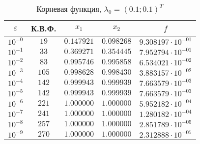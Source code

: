 \documentclass[a4paper,12pt,notitlepage,pdftex,headsepline]{scrartcl}
\begin{document}
        \begin{table}[ht]
          \centering
          \caption{Корневая функция, $\lambda_0 = (0.1; 0.1)^T$}
          \begin{tabular}{|c|c|c|c|c|}
            \hline
            $\varepsilon$ & К.В.Ф. & $x_1$ & $x_2$ & $f$\\
            \hline
            $10^{-0}$ & $19$ & $0.147921$ & $0.098268$ & $9.308197\cdot 10^{-01}$\\
            $10^{-1}$ & $33$ & $0.369271$ & $0.354445$ & $7.952794\cdot 10^{-01}$\\
            $10^{-2}$ & $83$ & $0.995746$ & $0.995858$ & $6.534021\cdot 10^{-02}$\\
            $10^{-3}$ & $105$ & $0.998628$ & $0.998430$ & $3.883157\cdot 10^{-02}$\\
            $10^{-4}$ & $142$ & $0.999943$ & $0.999939$ & $7.663579\cdot 10^{-03}$\\
            $10^{-5}$ & $142$ & $0.999943$ & $0.999939$ & $7.663579\cdot 10^{-03}$\\
            $10^{-6}$ & $221$ & $1.000000$ & $1.000000$ & $5.952182\cdot 10^{-04}$\\
            $10^{-7}$ & $241$ & $1.000000$ & $1.000000$ & $1.280182\cdot 10^{-04}$\\
            $10^{-8}$ & $257$ & $1.000000$ & $1.000000$ & $2.851789\cdot 10^{-05}$\\
            $10^{-9}$ & $270$ & $1.000000$ & $1.000000$ & $2.312888\cdot 10^{-05}$\\
            \hline
          \end{tabular}
        \end{table}

        \clearpage
\end{document}
